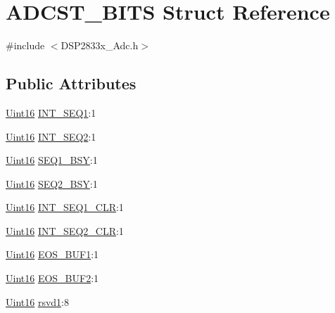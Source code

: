 \hypertarget{struct_a_d_c_s_t___b_i_t_s}{}\section{A\+D\+C\+S\+T\+\_\+\+B\+I\+T\+S Struct Reference}
\label{struct_a_d_c_s_t___b_i_t_s}


{\ttfamily \#include $<$D\+S\+P2833x\+\_\+\+Adc.\+h$>$}

\subsection*{Public Attributes}
\begin{DoxyCompactItemize}
\item 
\hyperlink{_d_s_p2833x___device_8h_a59a9f6be4562c327cbfb4f7e8e18f08b}{Uint16} \hyperlink{struct_a_d_c_s_t___b_i_t_s_aaf592908747424ba18b098a53e7305df}{I\+N\+T\+\_\+\+S\+E\+Q1}\+:1
\item 
\hyperlink{_d_s_p2833x___device_8h_a59a9f6be4562c327cbfb4f7e8e18f08b}{Uint16} \hyperlink{struct_a_d_c_s_t___b_i_t_s_a7d745bfc81387da5c586f19efa93e785}{I\+N\+T\+\_\+\+S\+E\+Q2}\+:1
\item 
\hyperlink{_d_s_p2833x___device_8h_a59a9f6be4562c327cbfb4f7e8e18f08b}{Uint16} \hyperlink{struct_a_d_c_s_t___b_i_t_s_a5246d56ae34c061489ef2d7c3d83818e}{S\+E\+Q1\+\_\+\+B\+S\+Y}\+:1
\item 
\hyperlink{_d_s_p2833x___device_8h_a59a9f6be4562c327cbfb4f7e8e18f08b}{Uint16} \hyperlink{struct_a_d_c_s_t___b_i_t_s_ae6024e3eeb0ccfe32a34292191a348cd}{S\+E\+Q2\+\_\+\+B\+S\+Y}\+:1
\item 
\hyperlink{_d_s_p2833x___device_8h_a59a9f6be4562c327cbfb4f7e8e18f08b}{Uint16} \hyperlink{struct_a_d_c_s_t___b_i_t_s_a92c17f6ef474213a88dfddab7425fa83}{I\+N\+T\+\_\+\+S\+E\+Q1\+\_\+\+C\+L\+R}\+:1
\item 
\hyperlink{_d_s_p2833x___device_8h_a59a9f6be4562c327cbfb4f7e8e18f08b}{Uint16} \hyperlink{struct_a_d_c_s_t___b_i_t_s_a43fe5d7644cd1e59ea4f440aac5562d0}{I\+N\+T\+\_\+\+S\+E\+Q2\+\_\+\+C\+L\+R}\+:1
\item 
\hyperlink{_d_s_p2833x___device_8h_a59a9f6be4562c327cbfb4f7e8e18f08b}{Uint16} \hyperlink{struct_a_d_c_s_t___b_i_t_s_a17b38192cc86ffdb2bb2c8ea8fffdbfd}{E\+O\+S\+\_\+\+B\+U\+F1}\+:1
\item 
\hyperlink{_d_s_p2833x___device_8h_a59a9f6be4562c327cbfb4f7e8e18f08b}{Uint16} \hyperlink{struct_a_d_c_s_t___b_i_t_s_a9553a2db788ab38e403e918d4f9e88a9}{E\+O\+S\+\_\+\+B\+U\+F2}\+:1
\item 
\hyperlink{_d_s_p2833x___device_8h_a59a9f6be4562c327cbfb4f7e8e18f08b}{Uint16} \hyperlink{struct_a_d_c_s_t___b_i_t_s_aba2d7010dd59648c338b1fb148d24a45}{rsvd1}\+:8
\end{DoxyCompactItemize}


